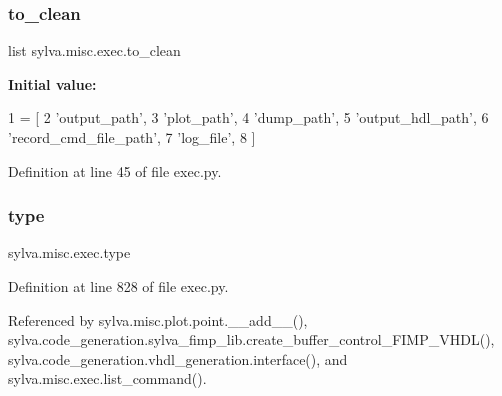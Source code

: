\subsubsection{\texorpdfstring{to\+\_\+clean}{to\_clean}}
{\footnotesize\ttfamily list sylva.\+misc.\+exec.\+to\+\_\+clean}

{\bfseries Initial value\+:}
\begin{DoxyCode}
1 =  [
2   \textcolor{stringliteral}{'output\_path'},
3   \textcolor{stringliteral}{'plot\_path'},
4   \textcolor{stringliteral}{'dump\_path'},
5   \textcolor{stringliteral}{'output\_hdl\_path'},
6   \textcolor{stringliteral}{'record\_cmd\_file\_path'},
7   \textcolor{stringliteral}{'log\_file'},
8 ]
\end{DoxyCode}


Definition at line 45 of file exec.\+py.

\mbox{\label{namespacesylva_1_1misc_1_1exec_a55d55e6d0e68715dfbd883034bd7290c}} 
\subsubsection{\texorpdfstring{type}{type}}
{\footnotesize\ttfamily sylva.\+misc.\+exec.\+type}



Definition at line 828 of file exec.\+py.



Referenced by sylva.\+misc.\+plot.\+point.\+\_\+\+\_\+add\+\_\+\+\_\+(), sylva.\+code\+\_\+generation.\+sylva\+\_\+fimp\+\_\+lib.\+create\+\_\+buffer\+\_\+control\+\_\+\+F\+I\+M\+P\+\_\+\+V\+H\+D\+L(), sylva.\+code\+\_\+generation.\+vhdl\+\_\+generation.\+interface(), and sylva.\+misc.\+exec.\+list\+\_\+command().

